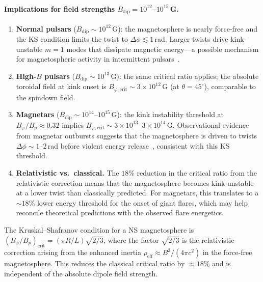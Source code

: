 \paragraph{Implications for field strengths $B_{\mathrm{dip}} = 10^{12}$--$10^{15}$\,G.}
\begin{enumerate}
\item \textbf{Normal pulsars} ($B_{\mathrm{dip}} \sim 10^{12}$\,G):
  the magnetosphere is nearly force-free and the KS condition
  limits the twist to $\Delta\phi \lesssim 1$\,rad.  Larger twists
  drive kink-unstable $m = 1$ modes that dissipate magnetic
  energy---a possible mechanism for magnetospheric activity in
  intermittent pulsars~\citep{Parfrey2013}.

\item \textbf{High-$B$ pulsars} ($B_{\mathrm{dip}} \sim 10^{13}$\,G):
  the same critical ratio applies; the absolute toroidal field at
  kink onset is $B_{\varphi,\mathrm{crit}} \sim 3\times10^{12}$\,G
  (at $\theta = 45^{\circ}$), comparable to the spindown field.

\item \textbf{Magnetars} ($B_{\mathrm{dip}} \sim 10^{14}$--$10^{15}$\,G):
  the kink instability threshold at $B_{\varphi}/B_{p} \approx 0.32$
  implies $B_{\varphi,\mathrm{crit}} \sim 3\times10^{13}$--$3\times10^{14}$\,G.
  Observational evidence from magnetar outbursts suggests that the
  magnetosphere is driven to twists $\Delta\phi \sim 1$--$2$\,rad
  before violent energy release~\citep{Thompson2002,Beloborodov2009},
  consistent with this KS threshold.

\item \textbf{Relativistic vs.\ classical.}
  The $18\%$ reduction in the critical ratio from the relativistic
  correction means that the magnetosphere becomes kink-unstable at
  a lower twist than classically predicted.  For magnetars, this
  translates to a $\sim 18\%$ lower energy threshold for the onset
  of giant flares, which may help reconcile theoretical predictions
  with the observed flare energetics.
\end{enumerate}

\begin{relcorrection}
The Kruskal--Shafranov condition for a NS magnetosphere is
$(B_{\varphi}/B_{p})_{\mathrm{crit}} = (\pi R/L)\sqrt{2/3}$,
where the factor $\sqrt{2/3}$ is the relativistic correction
arising from the enhanced inertia $\rho_{\mathrm{eff}} \approx
B^{2}/(4\pi c^{2})$ in the force-free magnetosphere.  This
reduces the classical critical ratio by $\approx 18\%$ and is
independent of the absolute dipole field strength.
\end{relcorrection}

